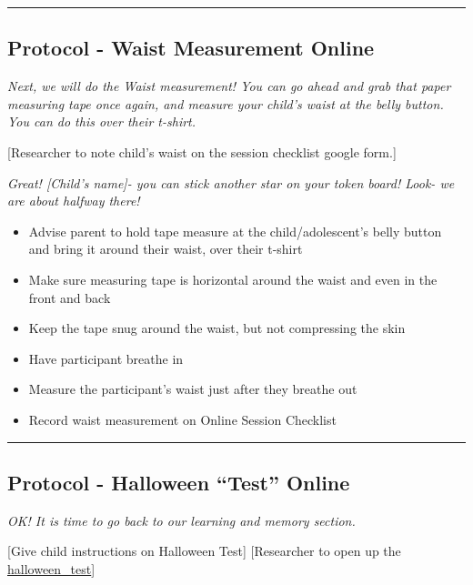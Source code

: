 \documentclass[]{book}
\providecommand{\tightlist}{%
  \setlength{\itemsep}{0pt}\setlength{\parskip}{0pt}}
\begin{document}
\begin{center}\rule{0.5\linewidth}{0.5pt}\end{center}

\hypertarget{protocol---waist-measurement-online}{%
\subsection{Protocol - Waist Measurement Online}\label{protocol---waist-measurement-online}}

\emph{Next, we will do the Waist measurement! You can go ahead and grab that paper measuring tape once again, and measure your child's waist at the belly button. You can do this over their t-shirt.}

{[}Researcher to note child's waist on the session checklist google form.{]}

\emph{Great! {[}Child's name{]}- you can stick another star on your token board! Look- we are about halfway there!}

\begin{itemize}
\tightlist
\item
  Advise parent to hold tape measure at the child/adolescent's belly button and bring it around their waist, over their t-shirt
\item
  Make sure measuring tape is horizontal around the waist and even in the front and back
\item
  Keep the tape snug around the waist, but not compressing the skin
\item
  Have participant breathe in
\item
  Measure the participant's waist just after they breathe out
\item
  Record waist measurement on Online Session Checklist
\end{itemize}

\begin{center}\rule{0.5\linewidth}{0.5pt}\end{center}

\hypertarget{protocol---halloween-test-online}{%
\subsection{Protocol - Halloween ``Test'' Online}\label{protocol---halloween-test-online}}

\emph{OK! It is time to go back to our learning and memory section.}

{[}Give child instructions on Halloween Test{]} {[}Researcher to open up the \href{https://ucla.app.box.com/file/709479264913}{halloween\_test}{]}
\end{document}
